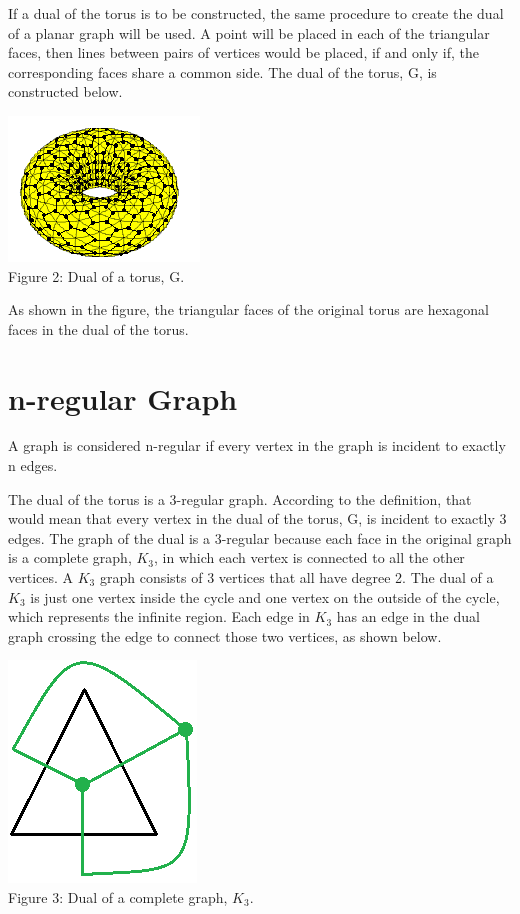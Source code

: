 \documentclass[12pt]{article}
\begin{document}
\begin{flushleft}
\medskip
If a dual of the torus is to be constructed, the same procedure to create the dual of a planar graph will be used. A point will be placed in each of the triangular faces, then lines between pairs of vertices would be placed, if and only if, the corresponding faces share a common side. The dual of the torus, G, is constructed below.

\begin{center}
\includegraphics[scale=1.25]{images/torus2.png}\\
Figure 2: Dual of a torus, G.
\end{center}

As shown in the figure, the triangular faces of the original torus are hexagonal faces in the dual of the torus.

\section*{n-regular Graph}
A graph is considered n-regular if every vertex in the graph is incident to exactly n edges.

\medskip
The dual of the torus is a 3-regular graph. According to the definition, that would mean that every vertex in the dual of the torus, G, is incident to exactly 3 edges. The graph of the dual is a 3-regular because each face in the original graph is a complete graph, $K_3$, in which each vertex is connected to all the other vertices. A $K_3$ graph consists of 3 vertices that all have degree 2. The dual of a $K_3$ is just one vertex inside the cycle and one vertex on the outside of the cycle, which represents the infinite region. Each edge in $K_3$ has an edge in the dual graph crossing the edge to connect those two vertices, as shown below.

\begin{center}
\includegraphics[scale=1]{images/k3dual.png}\\
Figure 3: Dual of a complete graph, $K_3$.
\end{center}


\end{flushleft}
\end{document}

